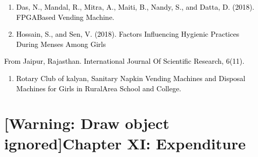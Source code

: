 \documentclass[letterpaper]{article}
\newcounter{saveenum}
\newcommand\liststyleWWNumix{%
\renewcommand\theenumi{\arabic{enumi}}
\renewcommand\labelenumi{\theenumi}
\renewcommand\labelitemi{{\textbullet}}
\renewcommand\labelitemii{{\textbullet}}
\renewcommand\labelitemiii{{\textbullet}}
}
\begin{document}
\bigskip

\liststyleWWNumix
\setcounter{saveenum}{\value{enumi}}
\begin{enumerate}
\setcounter{enumi}{\value{saveenum}}
\item \textcolor{black}{Das, N., Mandal, R., Mitra, A., Maiti, B., Nandy, S., and Datta, D. (2018). FPGABased Vending
Machine.}
\item \textcolor{black}{Hossain, S., and Sen, V. (2018). Factors Influencing Hygienic Practices During Menses Among
Girls}
\end{enumerate}
\textcolor{black}{From Jaipur, Rajasthan. International Journal Of Scientific Research, 6(11).}

\liststyleWWNumix
\setcounter{saveenum}{\value{enumi}}
\begin{enumerate}
\setcounter{enumi}{\value{saveenum}}
\item \textcolor{black}{Rotary Club of kalyan, Sanitary Napkin Vending Machines and Disposal Machines for Girls in
RuralArea School and College.}
\end{enumerate}
\clearpage\setcounter{page}{1}\pagestyle{Convertedxxiv}
\section[Chapter XI: Expenditure]{[Warning: Draw object ignored]Chapter XI: Expenditure}

\bigskip


\bigskip


\bigskip
\end{document}
